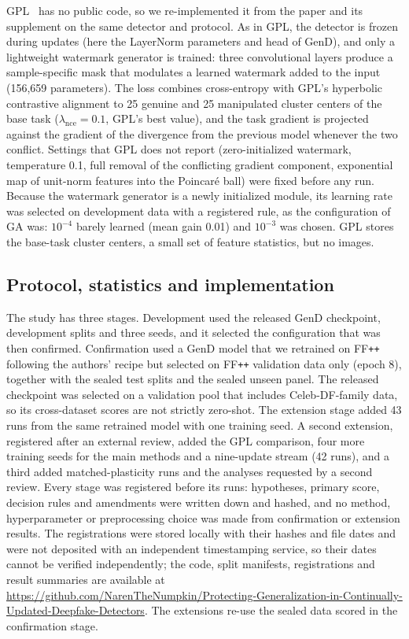 \documentclass[journal]{IEEEtran}
\newcommand{\ffpp}{FF\texttt{++}}
\begin{document}
GPL~\cite{zhang2025gpl} has no public code, so we re-implemented it from the paper and its supplement on the same detector and protocol. As in GPL, the detector is frozen during updates (here the LayerNorm parameters and head of GenD), and only a lightweight watermark generator is trained: three convolutional layers produce a sample-specific mask that modulates a learned watermark added to the input (156{,}659 parameters). The loss combines cross-entropy with GPL's hyperbolic contrastive alignment to 25 genuine and 25 manipulated cluster centers of the base task ($\lambda_{\mathrm{nce}}=0.1$, GPL's best value), and the task gradient is projected against the gradient of the divergence from the previous model whenever the two conflict. Settings that GPL does not report (zero-initialized watermark, temperature 0.1, full removal of the conflicting gradient component, exponential map of unit-norm features into the Poincar\'e ball) were fixed before any run. Because the watermark generator is a newly initialized module, its learning rate was selected on development data with a registered rule, as the configuration of GA was: $10^{-4}$ barely learned (mean gain 0.01) and $10^{-3}$ was chosen. GPL stores the base-task cluster centers, a small set of feature statistics, but no images.

\subsection{Protocol, statistics and implementation}
The study has three stages. Development used the released GenD checkpoint, development splits and three seeds, and it selected the configuration that was then confirmed. Confirmation used a GenD model that we retrained on \ffpp{} following the authors' recipe but selected on \ffpp{} validation data only (epoch 8), together with the sealed test splits and the sealed unseen panel. The released checkpoint was selected on a validation pool that includes Celeb-DF-family data, so its cross-dataset scores are not strictly zero-shot. The extension stage added 43 runs from the same retrained model with one training seed. A second extension, registered after an external review, added the GPL comparison, four more training seeds for the main methods and a nine-update stream (42 runs), and a third added matched-plasticity runs and the analyses requested by a second review. Every stage was registered before its runs: hypotheses, primary score, decision rules and amendments were written down and hashed, and no method, hyperparameter or preprocessing choice was made from confirmation or extension results. The registrations were stored locally with their hashes and file dates and were not deposited with an independent timestamping service, so their dates cannot be verified independently; the code, split manifests, registrations and result summaries are available at \url{https://github.com/NarenTheNumpkin/Protecting-Generalization-in-Continually-Updated-Deepfake-Detectors}. The extensions re-use the sealed data scored in the confirmation stage.
\end{document}
